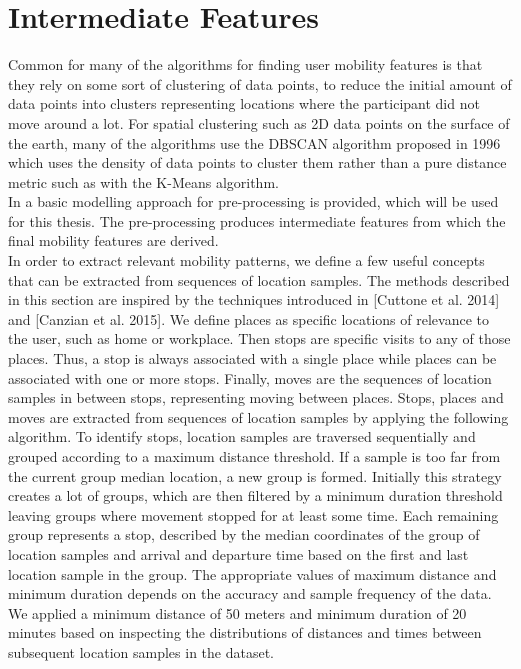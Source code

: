 \section{Intermediate Features}
Common for many of the algorithms for finding user mobility features is that they rely on some sort of clustering of data points, to reduce the initial amount of data points into clusters representing locations where the participant did not move around a lot. For spatial clustering such as 2D data points on the surface of the earth, many of the algorithms use the DBSCAN algorithm proposed in 1996  \cite{density-based-1996} which uses the density of data points to cluster them rather than a pure distance metric such as with the K-Means algorithm. \\

In \cite{sparse-location-2014} a basic modelling approach for pre-processing is provided, which will be used for this thesis. The pre-processing produces intermediate features from which the final mobility features are derived. \\

In order to extract relevant mobility patterns, we define a few useful concepts that can be extracted from sequences of location samples. The methods described in this section are inspired by the techniques introduced in [Cuttone et al. 2014] and [Canzian et al. 2015]. We define places as specific locations of relevance to the user, such as home or workplace. Then stops are specific visits to any of those places. Thus, a stop is always associated with a single place while places can be associated with one or more stops. Finally, moves are the sequences of location samples in between stops, representing moving between places. Stops, places and moves are extracted from sequences of location samples by applying the following algorithm. To identify stops, location samples are traversed sequentially and grouped according to a maximum distance threshold. If a sample is too far from the current group median location, a new group is formed. Initially this strategy creates a lot of groups, which are then filtered by a minimum duration threshold leaving groups where movement stopped for at least some time. Each remaining group represents a stop, described by the median coordinates of the group of location samples and arrival and departure time based on the first and last location sample in the group. The appropriate values of maximum distance and minimum duration depends on the accuracy and sample frequency of the data. We applied a minimum distance of 50 meters and minimum duration of 20 minutes based on inspecting the distributions of distances and times between subsequent location samples in the dataset.

